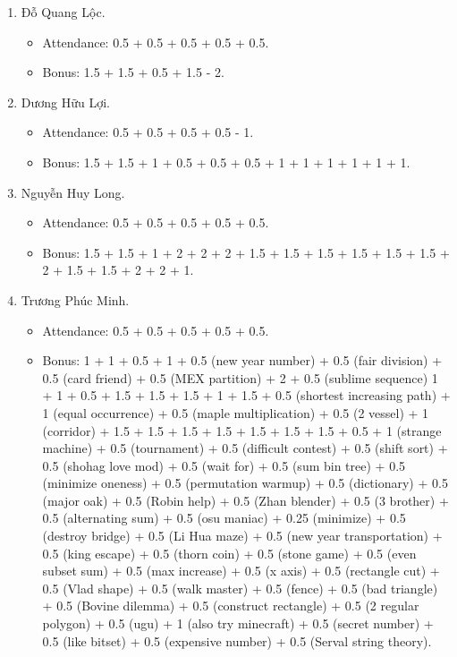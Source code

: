 \documentclass{article}
\begin{document}
\begin{enumerate}
\begin{itemize}
        \item Bonus: 0.5 + 1 + 0.5 + 1 + 1 + 1.5 + 1.5 + 1.5 + 1.5 + 1 + 1 + 1 + 1.
    \end{itemize}
    \item {\sc Đỗ Quang Lộc.}
    \begin{itemize}
        \item Attendance: 0.5 + 0.5 + 0.5 + 0.5 + 0.5.
        \item Bonus: 1.5 + 1.5 + 0.5 + 1.5 - 2.
    \end{itemize}
    \item {\sc Dương Hữu Lợi.}
    \begin{itemize}
        \item Attendance: 0.5 + 0.5 + 0.5 + 0.5 - 1.
        \item Bonus: 1.5 + 1.5 + 1 + 0.5 + 0.5 + 0.5 + 1 + 1 + 1 + 1 + 1 + 1.
    \end{itemize}
    \item {\sc Nguyễn Huy Long.}
    \begin{itemize}
        \item Attendance: 0.5 + 0.5 + 0.5 + 0.5 + 0.5.
        \item Bonus: 1.5 + 1.5 + 1 + 2 + 2 + 2 + 1.5 + 1.5 + 1.5 + 1.5 + 1.5 + 1.5 + 2 + 1.5 + 1.5 + 2 + 2 + 1.
    \end{itemize}
    \item {\sc Trương Phúc Minh.}
    \begin{itemize}
        \item Attendance: 0.5 + 0.5 + 0.5 + 0.5 + 0.5.
        \item Bonus: 1 + 1 + 0.5 + 1 + 0.5 (new year number) + 0.5 (fair division) + 0.5 (card friend) + 0.5 (MEX partition) + 2 + 0.5 (sublime sequence) 1 + 1 + 0.5 + 1.5 + 1.5 + 1.5 + 1 + 1.5 + 0.5 (shortest increasing path) + 1 (equal occurrence) + 0.5 (maple multiplication) + 0.5 (2 vessel) + 1 (corridor) + 1.5 + 1.5 + 1.5 + 1.5 + 1.5 + 1.5 + 1.5 + 0.5 + 1 (strange machine) + 0.5 (tournament) + 0.5 (difficult contest) + 0.5 (shift sort) + 0.5 (shohag love mod) + 0.5 (wait for) + 0.5 (sum bin tree) + 0.5 (minimize oneness) + 0.5 (permutation warmup) + 0.5 (dictionary) + 0.5 (major oak) + 0.5 (Robin help) + 0.5 (Zhan blender) + 0.5 (3 brother) + 0.5 (alternating sum) + 0.5 (osu maniac) + 0.25 (minimize) + 0.5 (destroy bridge) + 0.5 (Li Hua maze) + 0.5 (new year transportation) + 0.5 (king escape) + 0.5 (thorn coin) + 0.5 (stone game) + 0.5 (even subset sum) + 0.5 (max increase) + 0.5 (x axis) + 0.5 (rectangle cut) + 0.5 (Vlad shape) + 0.5 (walk master) + 0.5 (fence) + 0.5 (bad triangle) + 0.5 (Bovine dilemma) + 0.5 (construct rectangle) + 0.5 (2 regular polygon) + 0.5 (ugu) + 1 (also try minecraft) + 0.5 (secret number) + 0.5 (like bitset) + 0.5 (expensive number) + 0.5 (Serval string theory).

\end{itemize}
\end{enumerate}
\end{document}
